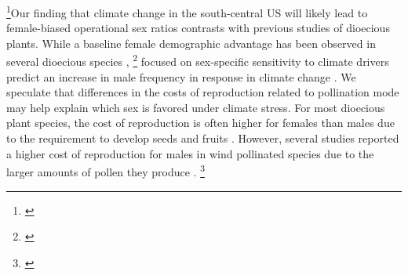 \documentclass[12pt]{article}\usepackage[]{graphicx}\usepackage[dvipsnames]{xcolor}
\newcommand{\tom}[2]{{\color{red}{#1}}\footnote{\textit{\color{red}{#2}}}}
\begin{document}
\tom{}{I like this paragraph. I would probably try to incorporate some older literature on costs of reproduction in dioecious plants. There are some classic papers from the 80s. There are also some papers by Sarah Eppley showing female advantage in grasses. I may not have understood the point you were trying to make about life history traits.}Our finding that climate change in the south-central US will likely lead to female-biased operational sex ratios contrasts with previous studies of dioecious plants. 
While a baseline female demographic advantage has been observed in several dioecious species \citep{welbergen2008climate,zhao2012sex,sasaki2019complex}, \tom{studies}{Are there more than just these two citations? This is good motivation to finish our meta-analysis!} focused on sex-specific sensitivity to climate drivers predict an increase in male frequency in response in climate change \citep{petry2016sex,hultine2016climate}. 
We speculate that differences in the costs of reproduction related to pollination mode may help explain which sex is favored under climate stress. 
For most dioecious plant species, the cost of reproduction is often higher for females than males due to the requirement to develop seeds and fruits \citep{hultine2016climate}. %
However, several studies reported a higher cost of reproduction for males in wind pollinated species due to the larger amounts of pollen they produce \citep{burli2022environmental,cipollini1994sexual,bruijning2017surviving,field2013comparative}. 
\tom{Additional comparative studies across species that differ in life history traits are needed to draw inferences regarding which types of species are likely to become female- or male-biased in response to global change stressors.}{Notice that I usually try to have each paragraph of the discussion end with a sentence that provides some synthesis of the ideas covered in the paragraph and/or identifies some direction for next steps. That is one of my strategies for writing a Discussion.} 
\end{document}
